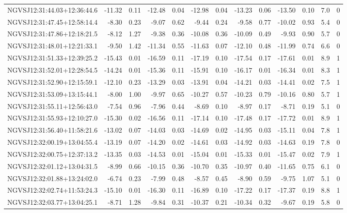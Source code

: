 \begin{tabular}{lrrrrrrrrrrcc}
NGVSJ12:31:44.03+12:36:44.6 & -11.32 & 0.11 & -12.48 & 0.04 & -12.98 & 0.04 & -13.23 & 0.06 & -13.50 & 0.10 & 7.0 & 0 \\
NGVSJ12:31:47.45+12:58:14.4 & -8.30 & 0.23 & -9.07 & 0.62 & -9.44 & 0.24 & -9.58 & 0.77 & -10.02 & 0.93 & 5.4 & 0 \\
NGVSJ12:31:47.86+12:18:21.5 & -8.12 & 1.27 & -9.38 & 0.36 & -10.08 & 0.36 & -10.09 & 0.49 & -9.93 & 0.90 & 5.7 & 0 \\
NGVSJ12:31:48.01+12:21:33.1 & -9.50 & 1.42 & -11.34 & 0.55 & -11.63 & 0.07 & -12.10 & 0.48 & -11.99 & 0.74 & 6.6 & 0 \\
NGVSJ12:31:51.33+12:39:25.2 & -15.43 & 0.01 & -16.59 & 0.11 & -17.19 & 0.10 & -17.54 & 0.17 & -17.61 & 0.01 & 8.9 & 1 \\
NGVSJ12:31:52.01+12:28:54.5 & -14.24 & 0.01 & -15.36 & 0.11 & -15.91 & 0.10 & -16.17 & 0.01 & -16.34 & 0.01 & 8.3 & 1 \\
NGVSJ12:31:52.90+12:15:59.1 & -12.10 & 0.23 & -13.29 & 0.03 & -13.91 & 0.04 & -14.21 & 0.03 & -14.41 & 0.02 & 7.5 & 1 \\
NGVSJ12:31:53.09+13:15:44.1 & -8.00 & 1.00 & -9.97 & 0.65 & -10.27 & 0.57 & -10.23 & 0.79 & -10.16 & 0.80 & 5.7 & 1 \\
NGVSJ12:31:55.11+12:56:43.0 & -7.54 & 0.96 & -7.96 & 0.44 & -8.69 & 0.10 & -8.97 & 0.17 & -8.71 & 0.19 & 5.1 & 0 \\
NGVSJ12:31:55.93+12:10:27.0 & -15.30 & 0.02 & -16.56 & 0.11 & -17.14 & 0.10 & -17.48 & 0.17 & -17.72 & 0.01 & 8.9 & 1 \\
NGVSJ12:31:56.40+11:58:21.6 & -13.02 & 0.07 & -14.03 & 0.03 & -14.69 & 0.02 & -14.95 & 0.03 & -15.11 & 0.04 & 7.8 & 1 \\
NGVSJ12:32:00.19+13:04:55.4 & -13.19 & 0.07 & -14.20 & 0.02 & -14.61 & 0.03 & -14.92 & 0.03 & -14.63 & 0.19 & 7.8 & 0 \\
NGVSJ12:32:00.75+12:37:13.2 & -13.35 & 0.03 & -14.53 & 0.01 & -15.04 & 0.01 & -15.33 & 0.01 & -15.47 & 0.02 & 7.9 & 1 \\
NGVSJ12:32:01.12+13:04:31.5 & -8.99 & 0.66 & -10.15 & 0.36 & -10.70 & 0.35 & -10.97 & 0.40 & -11.65 & 0.75 & 6.1 & 0 \\
NGVSJ12:32:01.88+13:24:02.0 & -6.74 & 0.23 & -7.99 & 0.48 & -8.57 & 0.45 & -8.90 & 0.59 & -9.75 & 1.07 & 5.1 & 0 \\
NGVSJ12:32:02.74+11:53:24.3 & -15.10 & 0.01 & -16.30 & 0.11 & -16.89 & 0.10 & -17.22 & 0.17 & -17.37 & 0.19 & 8.8 & 1 \\
NGVSJ12:32:03.77+13:04:25.1 & -8.71 & 1.28 & -9.84 & 0.31 & -10.37 & 0.21 & -10.34 & 0.32 & -9.67 & 0.19 & 5.8 & 0 \\

\end{tabular}
